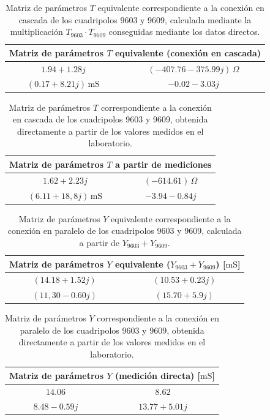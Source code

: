 \begin{table}[H]
\centering
\begin{tabular}{|c|c|}
\hline
\multicolumn{2}{|c|}{\textbf{Matriz de parámetros $T$ equivalente (conexión en cascada)}} \\ \hline
$1.94 + 1.28j$ & $(-407.76 - 375.99j)\,\Omega$ \\ \hline
$(0.17 + 8.21j)\,\mathrm{mS}$ & $-0.02 - 3.03j$ \\ \hline
\end{tabular}
\caption{Matriz de parámetros $T$ equivalente correspondiente a la conexión en cascada de los cuadripolos 9603 y 9609, calculada mediante la multiplicación $T_{9603} \cdot T_{9609}$ conseguidas mediante los datos directos.}
\label{tab:matriz_T_cascada_procuto}
\end{table}

\begin{table}[H]
\centering
\begin{tabular}{|c|c|}
\hline
\multicolumn{2}{|c|}{\textbf{Matriz de parámetros $T$ a partir de mediciones}} \\ \hline
$1.62 + 2.23j$ & $(-614.61)\,\Omega$ \\ \hline
$(6.11 + 18,8j)\,\mathrm{mS}$ & $-3.94 - 0.84j$ \\ \hline
\end{tabular}
\caption{Matriz de parámetros $T$ correspondiente a la conexión en cascada de los cuadripolos 9603 y 9609, obtenida directamente a partir de los valores medidos en el laboratorio.}
\label{tab:matriz_T_cascada_directa}
\end{table}

\begin{table}[H]
\centering
\begin{tabular}{|c|c|}
\hline
\multicolumn{2}{|c|}{\textbf{Matriz de parámetros $Y$ equivalente ($Y_{9603} + Y_{9609}$) [$\mathrm{mS}$] }} \\ \hline
$(14.18 + 1.52j)\,$ & $(10.53 + 0.23j)\,$ \\ \hline
$(11,30 - 0.60j)\,$ & $(15.70 + 5.9j)\,$ \\ \hline
\end{tabular}
\caption{Matriz de parámetros $Y$ equivalente correspondiente a la conexión en paralelo de los cuadripolos 9603 y 9609, calculada a partir de $Y_{9603} + Y_{9609}$.}
\label{tab:matriz_Y_paralelo_suma}
\end{table}

\begin{table}[H]
\centering
\begin{tabular}{|c|c|}
\hline
\multicolumn{2}{|c|}{\textbf{Matriz de parámetros $Y$ (medición directa) [$\mathrm{mS}$]}} \\ \hline
$14.06\, $ & $8.62\, $ \\ \hline
$8.48 - 0.59j\, $ & $13.77 + 5.01 j\,$ \\ \hline
\end{tabular}
\caption{Matriz de parámetros $Y$ correspondiente a la conexión en paralelo de los cuadripolos 9603 y 9609, obtenida directamente a partir de los valores medidos en el laboratorio.}
\label{tab:matriz_Y_paralelo_directa}
\end{table}

